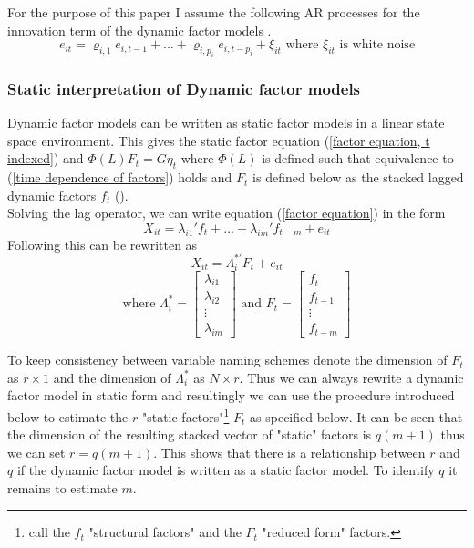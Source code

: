 \documentclass[12pt]{article}
\begin{document}
For the purpose of this paper I assume the following AR processes for the innovation term of the dynamic factor models \citep{breitung2011testing}.
\begin{equation}
	\label{AR process innovation term}
	e_{it} = \varrho_{i,1} e_{i, t-1} + ... + \varrho_{i, p_i} e_{i, t-p_i} + \xi_{it} \text{ where $\xi_{it}$ is white noise}
\end{equation}


\subsubsection{Static interpretation of Dynamic factor models}
\label{static interpretation of Dynamic factor models}
Dynamic factor models can be written as static factor models in a linear state space environment. This gives the static factor equation (\ref{factor equation, t indexed}) and $\Phi(L) F_t = G \eta_t$ where $\Phi(L)$ is defined such that equivalence to (\ref{time dependence of factors}) holds and $F_t$ is defined below as the stacked lagged dynamic factors $f_t$ (\citet{stock2011dynamic}). \\

Solving the lag operator, we can write equation (\ref{factor equation}) in the form 
\begin{equation}
	\label{factor equation, solved lag polynomial}
	X_{it} = \lambda_{i1}' f_t + ... + \lambda_{im}' f_{t-m} + e_{it}
\end{equation}
Following \citet{bai2002determining} this can be rewritten as 
$$X_{it} = \Lambda_i^{*'} F_t + e_{it}$$
$$\text{where } \Lambda_i^* = \begin{bmatrix} \lambda_{i1} \\ \lambda_{i2} \\ \vdots \\ \lambda_{im} \end{bmatrix} \text{ and } F_t = \begin{bmatrix} f_t \\ f_{t-1} \\ \vdots \\ f_{t-m} \end{bmatrix}$$

To keep consistency between variable naming schemes denote the dimension of $F_t$ as $r \times 1$ and the dimension of $\Lambda_i^*$ as $N \times r$. Thus we can always rewrite a dynamic factor model in static form and resultingly we can use the procedure introduced below to estimate the $r$ "static factors"\footnote{\citet{breitung2004identification} call the $f_t$ "structural factors" and the $F_t$ "reduced form" factors.} $F_t$ as specified below.
It can be seen that the dimension of the resulting stacked vector of "static" factors is $q(m+1)$ thus we can set $r=q(m+1)$. This shows that there is a relationship between $r$ and $q$ if the dynamic factor model is written as a static factor model. To identify $q$ it remains to estimate $m$.
\end{document}
